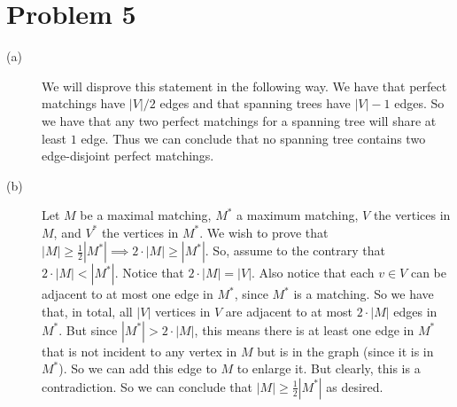 \documentclass{article}
\begin{document}
\section*{Problem 5}
\begin{description}
    \item[(a)] We will disprove this statement in the following way. We have
        that perfect matchings have $|V|/2$ edges and that spanning trees have
        $|V| - 1$ edges. So we have that any two perfect matchings for a
        spanning tree will share at least $1$ edge. Thus we can conclude that
        no spanning tree contains two edge-disjoint perfect matchings.
    \item[(b)] Let $M$ be a maximal matching, $M^*$ a maximum matching, $V$ the
        vertices in $M$, and $V^*$ the vertices in $M^*$.
        We wish to prove that $|M| \geq \frac{1}{2} |M^*|
        \implies 2 \cdot |M| \geq |M^*|$. So, assume to the contrary that $2
        \cdot |M| < |M^*|$. Notice that $2 \cdot |M| = |V|$. Also
        notice that each $v \in V$ can be adjacent to at most one edge in $M^*$,
        since $M^*$ is a matching.
        So we have that, in total, all $|V|$ vertices in $V$ are adjacent to at
        most $2 \cdot |M|$ edges in $M^*$. But since $|M^*| > 2 \cdot |M|$, this
        means there is at least one edge in $M^*$ that is not incident to any
        vertex in $M$ but is in the graph (since it is in $M^*$). So we can add
        this edge to $M$ to enlarge it.  But clearly, this is a contradiction.
        So we can conclude that $|M| \geq \frac{1}{2} |M^*|$ as desired.
\end{description}
\end{document}
